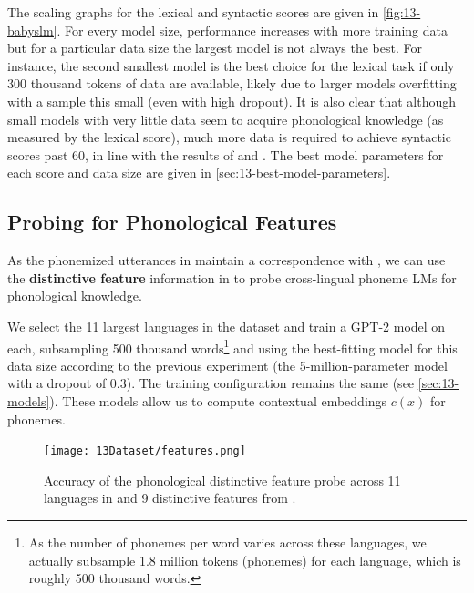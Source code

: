 The scaling graphs for the lexical and syntactic scores are given in \cref{fig:13-babyslm}. For every model size, performance increases with more training data but for a particular data size the largest model is not always the best. For instance, the second smallest model is the best choice for the lexical task if only 300 thousand tokens of data are available, likely due to larger models overfitting with a sample this small (even with high dropout). It is also clear that although small models with very little data seem to acquire phonological knowledge (as measured by the lexical score), much more data is required to achieve syntactic scores past 60, in line with the results of \citet{lavechin} and \citet{goriely2024babble}. The best model parameters for each score and data size are given in \cref{sec:13-best-model-parameters}.

\subsection{Probing for Phonological Features}\label{sec:13-featureprobing}



As the phonemized utterances in \ipachildes maintain a correspondence with \phoible, we can use the \textbf{distinctive feature} information in \phoible to probe cross-lingual phoneme LMs for phonological knowledge. 

We select the 11 largest languages in the dataset and train a GPT-2 model on each, subsampling 500 thousand words\footnote{As the number of phonemes per word varies across these languages, we actually subsample 1.8 million tokens (phonemes) for each language, which is roughly 500 thousand words.} and using the best-fitting model for this data size according to the previous experiment (the 5-million-parameter model with a dropout of 0.3). The training configuration remains the same (see \cref{sec:13-models}). These models allow us to compute contextual embeddings $c(x)$ for phonemes.

\begin{figure}[t]
    \centering
    \texttt{[image: 13Dataset/features.png]}
    \caption{Accuracy of the phonological distinctive feature probe across 11 languages in \ipachildes and 9 distinctive features from \phoible.} %
    \label{fig:13-features}
\end{figure}


